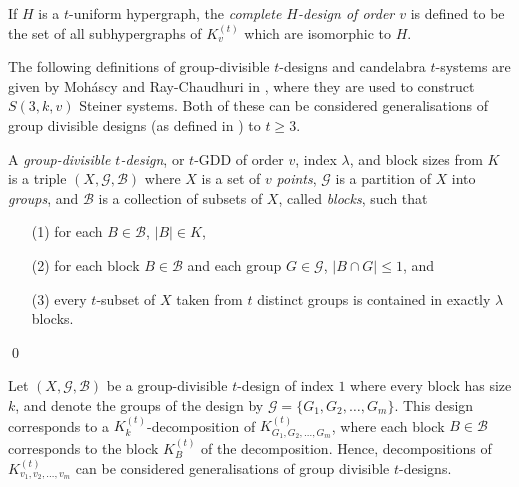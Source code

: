 If $H$ is a $t$-uniform hypergraph, the {\em complete $H$-design of order $v$} is defined to be the set of all subhypergraphs of $K_{v}^{(t)}$ which are isomorphic to $H$.



The following definitions of group-divisible $t$-designs and candelabra $t$-systems are given by Moh\'{a}scy and Ray-Chaudhuri in \cite{mohascy}, where they are used to construct $S(3, k, v)$ Steiner systems.
Both of these can be considered generalisations of group divisible designs (as defined in \cite{mull-gron}) to $t \geq 3$.

\begin{definition}
A {\em group-divisible $t$-design}, or $t$-GDD of order $v$, index $\lambda$, and block sizes from $K$ is a triple $(X, \mathcal{G}, \mathcal{B})$ where $X$ is a set of $v$ {\em points}, $\mathcal{G}$ is a partition of $X$ into {\em groups}, and $\mathcal{B}$ is a collection of subsets of $X$, called {\em blocks}, such that
\begin{enumerate}
    \item[(1)] for each $B \in \mathcal{B}$, $|B| \in K$,
    \item[(2)] for each block $B \in \mathcal{B}$ and each group $G \in \mathcal{G}$, $|B \cap G| \leq 1$, and
    \item[(3)] every $t$-subset of $X$ taken from $t$ distinct groups is contained in exactly $\lambda$ blocks.
\end{enumerate}
\qed
\end{definition}

Let $(X, \mathcal{G}, \mathcal{B})$ be a group-divisible $t$-design of index $1$ where every block has size $k$, and denote the groups of the design by $\mathcal{G} = \{G_1, G_2, \ldots, G_m\}$.
This design corresponds to a $K_{k}^{(t)}$-decomposition of $K_{G_1, G_2, \ldots, G_m}^{(t)}$, where each block $B \in \mathcal{B}$ corresponds to the block $K_{B}^{(t)}$ of the decomposition.
Hence, decompositions of $K_{v_1, v_2, \ldots, v_m}^{(t)}$ can be considered generalisations of group divisible $t$-designs.

